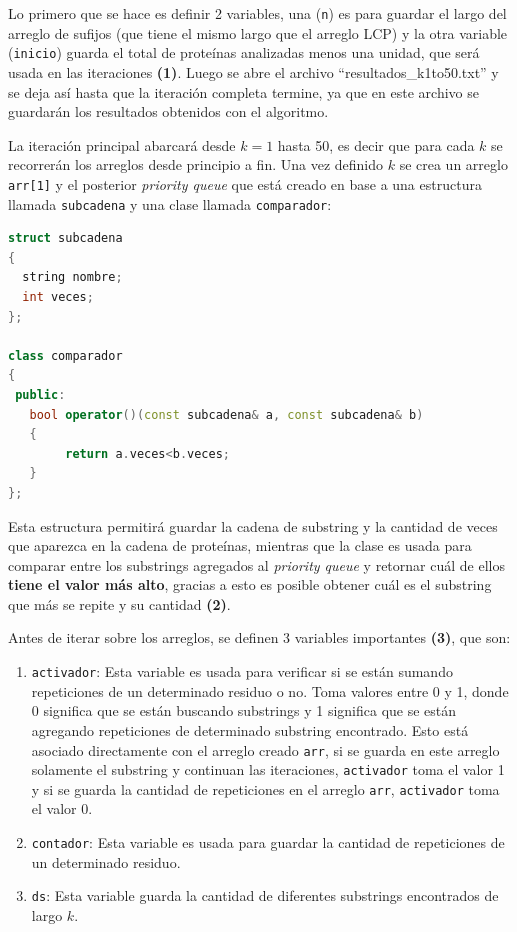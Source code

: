 Lo primero que se hace es definir 2 variables, una (\texttt{n}) es para guardar el largo del arreglo de sufijos (que tiene el mismo largo que el arreglo LCP) y la otra variable (\texttt{inicio}) guarda el total de proteínas analizadas menos una unidad, que será usada en las iteraciones \textbf{(1)}. Luego se abre el archivo ``resultados\_k1to50.txt'' y se deja así hasta que la iteración completa termine, ya que en este archivo se guardarán los resultados obtenidos con el algoritmo.

La iteración principal abarcará desde $k=1$ hasta 50, es decir que para cada $k$ se recorrerán los arreglos desde principio a fin. Una vez definido $k$ se crea un arreglo \texttt{arr[1]} y el posterior \textit{priority queue} que está creado en base a una estructura llamada \texttt{subcadena} y una clase llamada \texttt{comparador}:

\begin{lstlisting}[language=C++, caption=Implementación de \texttt{subcadena} y \texttt{comparador} como soportes del \textit{priority queue} a utilizar.]
struct subcadena
{
  string nombre;
  int veces;
};

class comparador
{
 public:
   bool operator()(const subcadena& a, const subcadena& b)
   {
        return a.veces<b.veces;
   }
};	
\end{lstlisting}

Esta estructura permitirá guardar la cadena de substring y la cantidad de veces que aparezca en la cadena de proteínas, mientras que la clase es usada para comparar entre los substrings agregados al \textit{priority queue} y retornar cuál de ellos \textbf{tiene el valor más alto}, gracias a esto es posible obtener cuál es el substring que más se repite y su cantidad \textbf{(2)}.

Antes de iterar sobre los arreglos, se definen 3 variables importantes \textbf{(3)}, que son:

\begin{enumerate}

\item \texttt{activador}: Esta variable es usada para verificar si se están sumando repeticiones de un determinado residuo o no. Toma valores entre 0 y 1, donde 0 significa que se están buscando substrings y 1 significa que se están agregando repeticiones de determinado substring encontrado. Esto está asociado directamente con el arreglo creado \texttt{arr}, si se guarda en este arreglo solamente el substring y continuan las iteraciones, \texttt{activador} toma el valor 1 y si se guarda la cantidad de repeticiones en el arreglo \texttt{arr}, \texttt{activador} toma el valor 0.
\item \texttt{contador}: Esta variable es usada para guardar la cantidad de repeticiones de un determinado residuo.
\item \texttt{ds}: Esta variable guarda la cantidad de diferentes substrings encontrados de largo $k$.
\end{enumerate}

